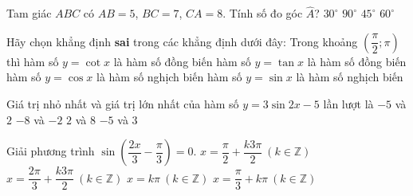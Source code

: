 \begin{ex}%
Tam giác $ABC$ có $AB=5$, $BC=7$, $CA=8$. Tính số đo góc $\widehat{A}$?
	\choice
	{$30^\circ$}
	{$90^\circ$}
	{$45^\circ$}
	{\True $60^\circ$}
\end{ex}

\begin{ex}%
Hãy chọn khẳng định \textbf{sai} trong các khẳng định dưới đây: Trong khoảng $\left(\dfrac{\pi}{2};\pi\right)$ thì
	\choice
	{\True hàm số $y=\cot x$ là hàm số đồng biến}
	{hàm số $y=\tan x$ là hàm số đồng biến}
	{hàm số $y=\cos x$ là hàm số nghịch biến}
	{hàm số $y=\sin x$ là hàm số nghịch biến}
\end{ex}

\begin{ex}%
Giá trị nhỏ nhất và giá trị lớn nhất của hàm số $y=3\sin 2x-5$ lần lượt là
	\choice
	{$-5$ và $2$}
	{\True $-8$ và $-2$}
	{$2$ và $8$}
	{$-5$ và $3$}
\end{ex}

\begin{ex}%
Giải phương trình $\sin\left(\dfrac{2x}{3}-\dfrac{\pi}{3}\right)=0$.
	\choice
	{\True $x=\dfrac{\pi}{2}+\dfrac{k3\pi}{2}\ (k\in\mathbb{Z})$}
	{$x=\dfrac{2\pi}{3}+\dfrac{k3\pi}{2}\ (k\in\mathbb{Z})$}
	{$x=k\pi\ (k\in\mathbb{Z})$}
	{$x=\dfrac{\pi}{3}+k\pi\ (k\in\mathbb{Z})$}
\end{ex}

